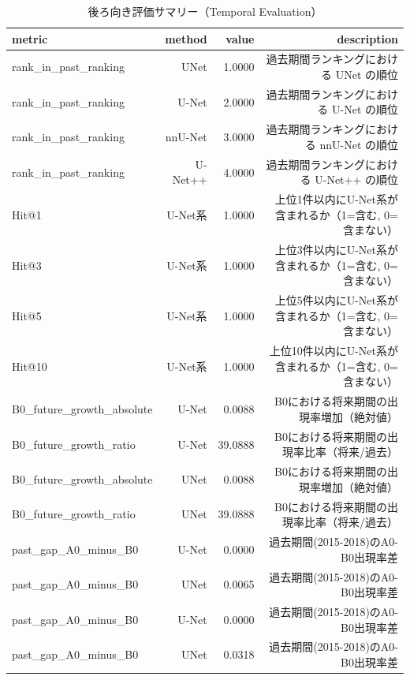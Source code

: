 \begin{table}[htbp]
  \centering
  \caption{後ろ向き評価サマリー（Temporal Evaluation）}
  \label{tab:temporal_eval}
  \begin{tabular}{lrrr}
    \hline
    metric & method & value & description \\
    \hline
    rank\_in\_past\_ranking & UNet & 1.0000 & 過去期間ランキングにおける UNet の順位 \\
    rank\_in\_past\_ranking & U-Net & 2.0000 & 過去期間ランキングにおける U-Net の順位 \\
    rank\_in\_past\_ranking & nnU-Net & 3.0000 & 過去期間ランキングにおける nnU-Net の順位 \\
    rank\_in\_past\_ranking & U-Net++ & 4.0000 & 過去期間ランキングにおける U-Net++ の順位 \\
    Hit@1 & U-Net系 & 1.0000 & 上位1件以内にU-Net系が含まれるか（1=含む, 0=含まない） \\
    Hit@3 & U-Net系 & 1.0000 & 上位3件以内にU-Net系が含まれるか（1=含む, 0=含まない） \\
    Hit@5 & U-Net系 & 1.0000 & 上位5件以内にU-Net系が含まれるか（1=含む, 0=含まない） \\
    Hit@10 & U-Net系 & 1.0000 & 上位10件以内にU-Net系が含まれるか（1=含む, 0=含まない） \\
    B0\_future\_growth\_absolute & U-Net & 0.0088 & B0における将来期間の出現率増加（絶対値） \\
    B0\_future\_growth\_ratio & U-Net & 39.0888 & B0における将来期間の出現率比率（将来/過去） \\
    B0\_future\_growth\_absolute & UNet & 0.0088 & B0における将来期間の出現率増加（絶対値） \\
    B0\_future\_growth\_ratio & UNet & 39.0888 & B0における将来期間の出現率比率（将来/過去） \\
    past\_gap\_A0\_minus\_B0 & U-Net & 0.0000 & 過去期間(2015-2018)のA0-B0出現率差 \\
    past\_gap\_A0\_minus\_B0 & UNet & 0.0065 & 過去期間(2015-2018)のA0-B0出現率差 \\
    past\_gap\_A0\_minus\_B0 & U-Net & 0.0000 & 過去期間(2015-2018)のA0-B0出現率差 \\
    past\_gap\_A0\_minus\_B0 & UNet & 0.0318 & 過去期間(2015-2018)のA0-B0出現率差 \\
    \hline
  \end{tabular}
\end{table}